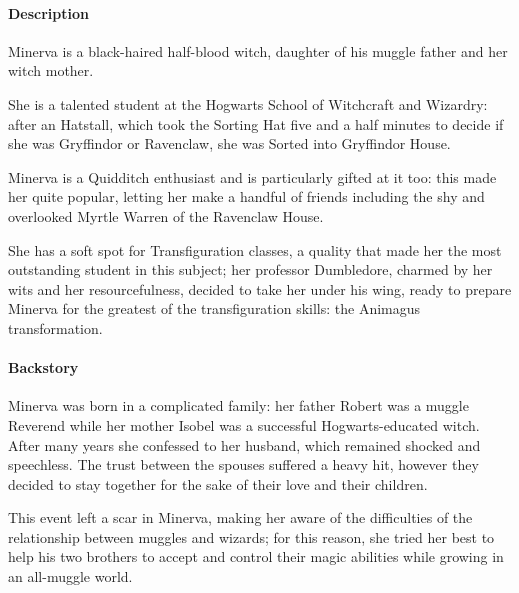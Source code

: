 
\paragraph{Description}
Minerva is a black-haired half-blood witch, daughter of his muggle father and her witch mother.

She is a talented student at the Hogwarts School of Witchcraft and Wizardry: after an Hatstall, which took the Sorting Hat five and a half minutes to decide if she was Gryffindor or Ravenclaw, she was Sorted into Gryffindor House. 

Minerva is a Quidditch enthusiast and is particularly gifted at it too: this made her quite popular, letting her make a handful of friends including the shy and overlooked Myrtle Warren of the Ravenclaw House.

She has a soft spot for Transfiguration classes, a quality that made her the most outstanding student in this subject; her professor Dumbledore, charmed by her wits and her resourcefulness, decided to take her under his wing, ready to prepare Minerva for the greatest of the transfiguration skills: the Animagus transformation.

\paragraph{Backstory}
Minerva was born in a complicated family: her father Robert was a muggle Reverend while her mother Isobel was a successful Hogwarts-educated witch. After many years she confessed to her husband, which remained shocked and speechless. The trust between the spouses suffered a heavy hit, however they decided to stay together for the sake of their love and their children.

This event left a scar in Minerva, making her aware of the difficulties of the relationship between muggles and wizards; for this reason, she tried her best to help his two brothers to accept and control their magic abilities while growing in an all-muggle world.




\clearpage